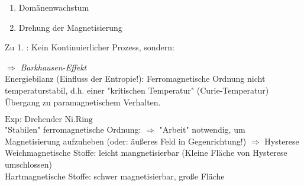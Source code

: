 \begin{enumerate}
	\item Domänenwachstum
	\item Drehung der Magnetisierung
\end{enumerate}

Zu 1. : Kein Kontinuierlicher Prozess, sondern:

\bild
$ \Rightarrow $ \emph{Barkhausen-Effekt} \\ \break
Energiebilanz (Einfluss der Entropie!): Ferromagnetische Ordnung nicht temperaturstabil, d.h. einer "kritischen Temperatur" (Curie-Temperatur) Übergang zu paramagnetischem Verhalten.\\ \break

$ \boxed{\text{Exp: Drehender Ni.Ring}} $ \\
"Stabilen" ferromagnetische Ordnung:
$ \Rightarrow $ "Arbeit" notwendig, um Magnetisierung aufzuheben (oder: äußeres Feld in Gegenrichtung!)
\bild
$ \Rightarrow $ Hysterese \\
Weichmagnetische Stoffe: leicht mangnetisierbar (Kleine Fläche von Hysterese umschlossen)\\
Hartmagnetische Stoffe: schwer magnetisierbar, große Fläche\\
